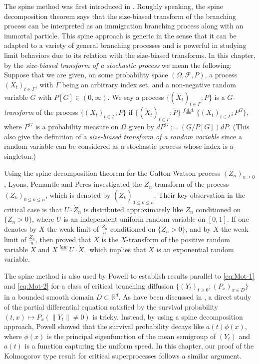 \documentclass[UTF8]{pkuthss}
\theoremstyle{plain}
\theoremstyle{definition}
\numberwithin{equation}{section}
\begin{document}
The spine method was first introduced in \cite{LyonsPemantlePeres1995Conceptual}.
	Roughly speaking, the spine decomposition theorem says that the size-biased transform of the branching process can be interpreted as an immigration branching process along with an immortal particle.
	This spine approach is generic in the sense that it can be adapted to a variety of general branching processes and is powerful in studying limit behaviors due to its relation with the size-biased transforms.
	In this chapter, by the \emph{size-biased transform of a stochastic process} we mean the following:
Suppose that we are given, on some probability space $(\Omega,\mathscr F,P)$, a process $(X_t)_{t\in \Gamma}$, with $\Gamma$ being an arbitrary index set, and a non-negative random variable $G$ with $ P[G] \in (0,\infty)$.
	We say a process $\{(\dot X_t)_{t\in \Gamma}; \dot P\}$ is a \emph{$G$-transform} of the process $\{(X_t)_{t\in \Gamma}; P\}$ if $\{(\dot X_t)_{t\in \Gamma}; \dot P\} \overset{f.d.d.}{=} \{(X_t)_{t\in \Gamma}; P^G\}$, where $P^G$ is a probability  measure on $\Omega$ given by $dP^G := (G/P[G]) dP$. (This also give the definition of a \emph{size-biased transform of a random variable} since a random variable can be considered as a stochastic process 
whose index is a singleton.)

	Using the spine decomposition theorem for the Galton-Watson process $(Z_n)_{n\geq 0}$, Lyons, Pemantle and Peres \cite{LyonsPemantlePeres1995Conceptual} investigated the $Z_n$-transform of the process $(Z_k)_{0\leq k\leq n}$, which is denoted by $(\dot Z_k)_{0\leq k\leq n}$.
	Their key observation in the critical case is that $U\cdot \dot Z_n$ is distributed approximately like $Z_n$ conditioned on $\{Z_n > 0\}$, where $U$ is an independent uniform random variable on $[0,1]$.
	If one denotes by $X$ the weak limit of $\frac{Z_n}{n}$ conditioned on $\{Z_n > 0\}$, and by $\dot X$  the weak limit of $\frac{\dot Z_n}{n}$, then \cite{LyonsPemantlePeres1995Conceptual} proved that $\dot X$ is the $X$-transform of the positive random variable $X$ and
$X\overset{law}{=} U \cdot \dot X,$
	which implies that $X$ is an exponential random variable.

    The spine method is also used by Powell \cite{Powell2016An-invariance}
	to establish results parallel to \eqref{eq:Mot-1} and \eqref{eq:Mot-2} for a class of critical branching diffusion $\{(Y_t)_{t\geq 0}; (P_x)_{x\in D}\}$ in a bounded smooth domain $D\subset \mathbb R^d$.
	As have been discussed in \cite{Powell2016An-invariance}, a direct study of the partial differential equation satisfied by the survival probability $(t,x) \mapsto P_{x}(\|Y_t\| \neq 0)$ is tricky.
	Instead, by using a spine decomposition approach, Powell \cite{Powell2016An-invariance} showed that the survival probability decays like $a(t)\phi(x)$, where $\phi(x)$ is the principal eigenfunction of the mean semigroup of $(Y_t)$ and $a(t)$ is a function capturing the uniform speed.
	In this chapter, our proof of the Kolmogorov type result 
   for critical superprocesses follows a similar argument.
\end{document}
